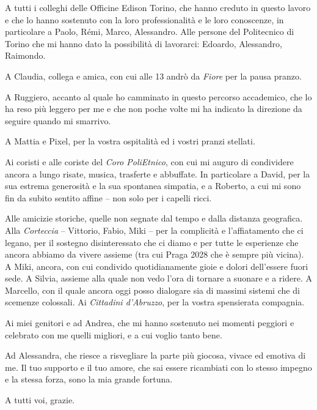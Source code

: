 A tutti i colleghi delle Officine Edison Torino, che hanno creduto in questo lavoro e che lo hanno sostenuto con la loro professionalità e le loro conoscenze, in particolare a Paolo, Rémi, Marco, Alessandro. Alle persone del Politecnico di Torino che mi hanno dato la possibilità di lavorarci: Edoardo, Alessandro, Raimondo.

\smallskip

A Claudia, collega e amica, con cui alle 13 andrò da \textit{Fiore} per la pausa pranzo.

\smallskip

A Ruggiero, accanto al quale ho camminato in questo percorso accademico, che lo ha reso più leggero per me e che non poche volte mi ha indicato la direzione da seguire quando mi smarrivo.

\smallskip

A Mattia e Pixel, per la vostra ospitalità ed i vostri pranzi stellati.

\smallskip

Ai coristi e alle coriste del \textit{Coro PoliEtnico}, con cui mi auguro di condividere ancora a lungo risate, musica, trasferte e abbuffate. In particolare a David, per la sua estrema generosità e la sua spontanea simpatia, e a Roberto, a cui mi sono fin da subito sentito affine -- non solo per i capelli ricci.

\smallskip

Alle amicizie storiche, quelle non segnate dal tempo e dalla distanza geografica. Alla \textit{Corteccia} -- Vittorio, Fabio, Miki -- per la complicità e l'affiatamento che ci legano, per il sostegno disinteressato che ci diamo e per tutte le esperienze che ancora abbiamo da vivere assieme (tra cui Praga 2028 che è sempre più vicina). A Miki, ancora, con cui condivido quotidianamente gioie e dolori dell'essere fuori sede. A Silvia, assieme alla quale non vedo l'ora di tornare a suonare e a ridere. A Marcello, con il quale ancora oggi posso dialogare sia di massimi sistemi che di scemenze colossali. Ai \textit{Cittadini d'Abruzzo}, per la vostra spensierata compagnia.

\smallskip

Ai miei genitori e ad Andrea, che mi hanno sostenuto nei momenti peggiori e celebrato con me quelli migliori, e a cui voglio tanto bene.

\smallskip

Ad Alessandra, che riesce a risvegliare la parte più giocosa,  vivace ed emotiva di me. Il tuo supporto e il tuo amore, che sai essere ricambiati con lo stesso impegno e la stessa forza, sono la mia grande fortuna.

\bigskip

A tutti voi, grazie.


